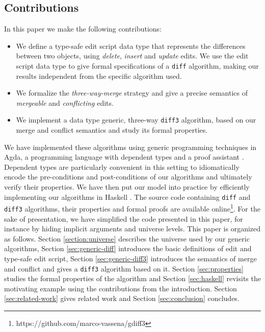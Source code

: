 \documentclass{sigplanconf}
\theoremstyle{plain}
\begin{document}
\subsection{Contributions}
In this paper we make the following contributions:
\begin{itemize}
\item We define a type-safe edit script data 
      type that represents the differences between two objects, using
      \emph{delete}, \emph{insert} and \emph{update} edits.
      We use the edit script data type to give formal specifications
      of a \texttt{diff} algorithm, making our results independent 
      from the specific algorithm used.
    \item We formalize the \emph{three-way-merge} strategy and give a
      precise semantics of \emph{mergeable} and \emph{conflicting}
      edits. 
    \item We implement a data type generic, three-way \texttt{diff3}
      algorithm, based on our merge and conflict semantics and study
      its formal properties.
\end{itemize}
We have implemented these algorithms using generic programming
techniques in Agda, a programming language with dependent types and a
proof assistant \cite{Bove09}.
%
Dependent types are particularly convenient in this setting to
idiomatically encode the pre-conditions and post-conditions of our
algorithms and ultimately verify their properties.
%
We have then put our model into practice by efficiently implementing
our algorithms in Haskell \cite{Marlow_haskell2010}.
%
%
The source code containing \texttt{diff} and \texttt{diff3}
algorithms, their properties and formal proofs are available
online\footnote{https://github.com/marco-vassena/gdiff3}.  For the
sake of presentation, we have simplified the code presented in this
paper, for instance by hiding implicit arguments and universe levels.
%
This paper is organized as follows.
%
Section \ref{section:universe} describes the universe used by our
generic algorithms, Section \ref{sec:generic-diff} introduces the
basic definitions of edit and type-safe edit script, Section
\ref{sec:generic-diff3} introduces the semantics of merge and conflict
and gives a \texttt{diff3} algorithm based on it. Section
\ref{sec:properties} studies the formal properties of the algorithm
and Section \ref{sec:haskell} revisits the motivating example using
the contributions from the introduction.  Section
\ref{sec:related-work} gives related work and Section
\ref{sec:conclusion} concludes.
\end{document}
